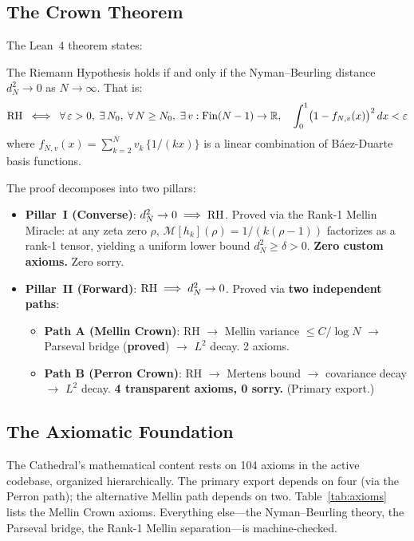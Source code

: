\documentclass[11pt,a4paper]{article}
\begin{document}
\subsection{The Crown Theorem}

The Lean~4 theorem  states:
\begin{theorem}
\label{thm:crown}
The Riemann Hypothesis holds if and only if the Nyman--Beurling distance
$d_N^2 \to 0$ as $N \to \infty$. That is:
\[
  \mathrm{RH} \;\iff\;
  \forall\,\varepsilon > 0,\;\exists\,N_0,\;\forall\,N \geq N_0,\;
  \exists\,v : \mathrm{Fin}(N-1) \to \mathbb{R},\quad
  \int_0^1 \bigl(1 - f_{N,v}(x)\bigr)^2\,dx < \varepsilon
\]
where $f_{N,v}(x) = \sum_{k=2}^{N} v_k\,\{1/(kx)\}$ is a linear combination
of B\'aez-Duarte basis functions.
\end{theorem}

The proof decomposes into two pillars:
\begin{itemize}
  \item \textbf{Pillar~I (Converse)}: $d_N^2 \to 0 \implies \mathrm{RH}$.
    Proved via the Rank-1 Mellin Miracle: at any zeta zero $\rho$,
    $\mathcal{M}[h_k](\rho) = 1/(k(\rho-1))$ factorizes as a rank-1
    tensor, yielding a uniform lower bound $d_N^2 \geq \delta > 0$.
    \textbf{Zero custom axioms.} Zero sorry.
  \item \textbf{Pillar~II (Forward)}: $\mathrm{RH} \implies d_N^2 \to 0$.
    Proved via \textbf{two independent paths}:
    \begin{itemize}
      \item \textbf{Path A (Mellin Crown)}: RH $\to$ Mellin variance $\le C/\log N$
        $\to$ Parseval bridge (\textbf{proved}) $\to$ $L^2$ decay.
        2 axioms.
      \item \textbf{Path B (Perron Crown)}: RH $\to$ Mertens bound
        $\to$ covariance decay $\to$ $L^2$ decay.
        \textbf{4 transparent axioms, 0 sorry.} (Primary export.)
    \end{itemize}
\end{itemize}

\subsection{The Axiomatic Foundation}

The Cathedral's mathematical content rests on 104 axioms in the active
codebase, organized hierarchically. The primary export
 depends on four (via the Perron path);
the alternative Mellin path depends on two.
Table~\ref{tab:axioms} lists the Mellin Crown axioms. Everything
else---the Nyman--Beurling theory, the Parseval bridge, the Rank-1 Mellin
separation---is machine-checked.
\end{document}
